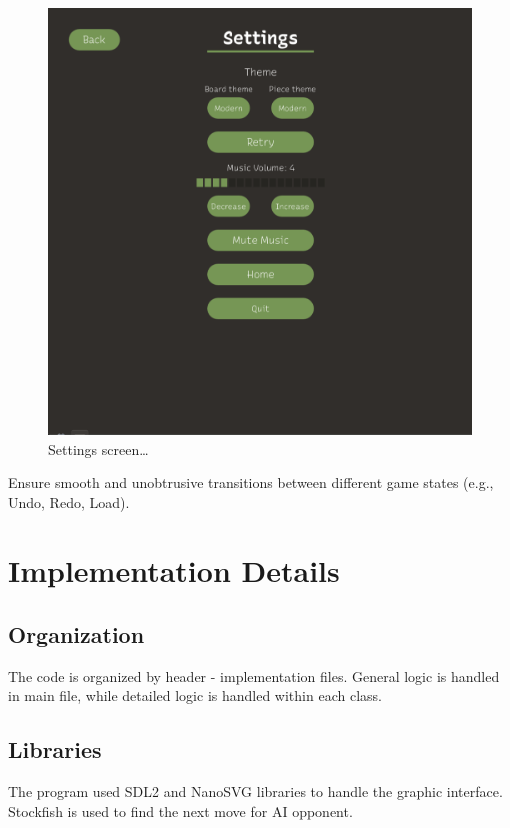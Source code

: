 \documentclass[a4paper, 10pt, titlepage]{report}
\begin{document}
  \begin{figure}%
    \includegraphics[width=\linewidth]{settings_screen.png}
    \caption{Settings screen\dots}
    \label{fig:fifth}
  \end{figure}%

Ensure smooth and unobtrusive transitions between different game states (e.g., Undo, Redo, Load).
\chapter{Implementation Details}
\section{Organization}
The code is organized by header - implementation files. General logic is handled in main file, while detailed logic is handled within each class.
\section{Libraries}
The program used SDL2 and NanoSVG libraries to handle the graphic interface. Stockfish is used to find the next move for AI opponent.
\end{document}
